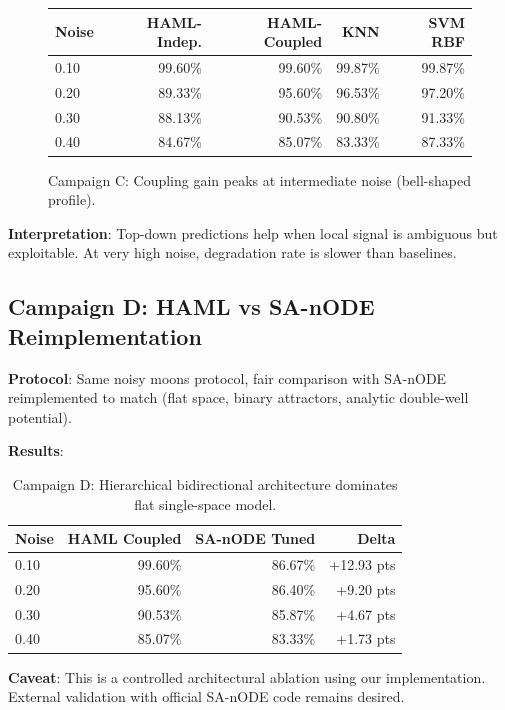 \documentclass[11pt,a4paper]{article}
\begin{document}
\begin{figure}[h]
\centering
\begin{tabular}{lrrrr}
\toprule
\textbf{Noise} & \textbf{HAML-Indep.} & \textbf{HAML-Coupled} & \textbf{KNN} & \textbf{SVM RBF} \\
\midrule
0.10 & 99.60\% & 99.60\% & 99.87\% & 99.87\% \\
0.20 & 89.33\% & 95.60\% & 96.53\% & 97.20\% \\
0.30 & 88.13\% & 90.53\% & 90.80\% & 91.33\% \\
0.40 & 84.67\% & 85.07\% & 83.33\% & 87.33\% \\
\bottomrule
\end{tabular}
\caption{Campaign C: Coupling gain peaks at intermediate noise (bell-shaped profile).}
\end{figure}

\textbf{Interpretation}: Top-down predictions help when local signal is ambiguous but exploitable. At very high noise, degradation rate is slower than baselines.

\subsection{Campaign D: HAML vs SA-nODE Reimplementation}

\textbf{Protocol}: Same noisy moons protocol, fair comparison with SA-nODE reimplemented to match (flat space, binary attractors, analytic double-well potential).

\textbf{Results}:
\begin{table}[h]
\centering
\begin{tabular}{lrrr}
\toprule
\textbf{Noise} & \textbf{HAML Coupled} & \textbf{SA-nODE Tuned} & \textbf{Delta} \\
\midrule
0.10 & 99.60\% & 86.67\% & +12.93 pts \\
0.20 & 95.60\% & 86.40\% & +9.20 pts \\
0.30 & 90.53\% & 85.87\% & +4.67 pts \\
0.40 & 85.07\% & 83.33\% & +1.73 pts \\
\bottomrule
\end{tabular}
\caption{Campaign D: Hierarchical bidirectional architecture dominates flat single-space model.}
\end{table}

\textbf{Caveat}: This is a controlled architectural ablation using our implementation. External validation with official SA-nODE code remains desired.
\end{document}
